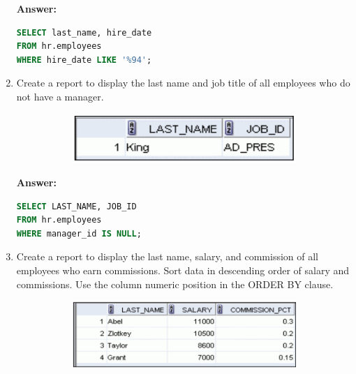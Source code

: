 \documentclass[a4paper,12pt]{article}
\begin{document}
\begin{enumerate}
    \textbf{Answer: }
    \begin{lstlisting}[language=SQL, label={lst:employees_data}]
SELECT last_name, hire_date
FROM hr.employees
WHERE hire_date LIKE '%94';
    \end{lstlisting}

    \item Create a report to display the last name and job title of all employees who do not have a
manager.
\begin{figure}[h]
        \centering
        \begin{subfigure}[b]{0.35\linewidth}
            \centering
            \includegraphics[width=\linewidth]{graphics/28.png}
        \end{subfigure}
    \end{figure}        
    
    \textbf{Answer: }
    \begin{lstlisting}[language=SQL, label={lst:employees_data}]
SELECT LAST_NAME, JOB_ID
FROM hr.employees
WHERE manager_id IS NULL;
    \end{lstlisting}
    \item Create a report to display the last name, salary, and commission of all employees who earn
commissions. Sort data in descending order of salary and commissions.
Use the column numeric position in the ORDER BY clause.
\begin{figure}[h]
        \centering
        \begin{subfigure}[b]{0.6\linewidth}
            \centering
            \includegraphics[width=\linewidth]{graphics/29.png}
        \end{subfigure}
    \end{figure}        
    

\end{enumerate}
\end{document}
